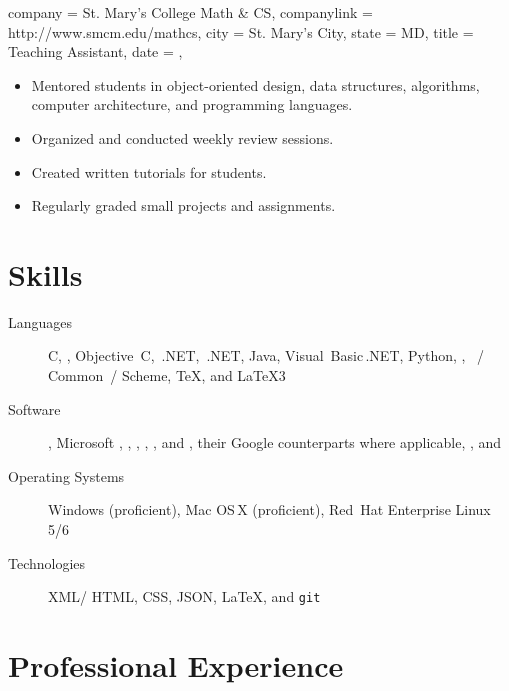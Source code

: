 \documentclass[
textout=\jobname.cv.txt,
textout preamble = preamble.txt,
]{bettercv}
\begin{document}
\begin{position}
  {
    company = St. Mary's College \Dash Math \& CS,
    companylink = http://www.smcm.edu/mathcs,
    city    = St. Mary's City,
    state   = MD,
    title   = Teaching Assistant,
    date    = ,
  }

\begin{itemize}
\item Mentored students in object-oriented design, data structures, algorithms, computer architecture, and programming languages.
\item Organized and conducted weekly review sessions.
\item Created written tutorials for students.
\item Regularly graded small projects and assignments.
\end{itemize}
\end{position}

\section{Skills}

\begin{description}
\item[Languages]
  C,
  \CPP,
  Objective~C,
  \CPP\,.NET,
  \CSharp\,.NET,
  Java,
  Visual~Basic\,.NET,
  Python,
  ,
  ~\Lisp\slash
            Common~\Lisp\slash
            Scheme,
  \TeX,
  and \LaTeX3

\item[Software]
  ,
  Microsoft ,
            ,
            ,
            ,
            ,
            and ,
  their Google counterparts where applicable,
  ,
  and 

\item[Operating Systems]
  Windows (proficient),
  Mac OS\,X (proficient),
  Red~Hat Enterprise Linux 5\slash 6

\item[Technologies]
  XML\slash
  HTML,
  CSS,
  JSON,
  \LaTeX,
  and \texttt{git}
\end{description}

\section{Professional Experience}
\end{document}
